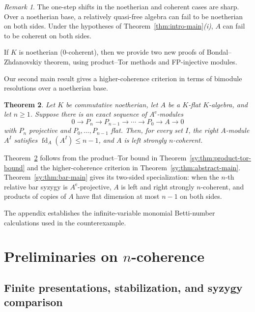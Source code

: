 \documentclass[11pt]{article}
\numberwithin{equation}{section}
\newtheorem{theorem}{Theorem}[section]
\theoremstyle{definition}
\theoremstyle{remark}
\newtheorem{remark}[theorem]{Remark}
\begin{document}
\begin{remark}
The one-step shifts in the noetherian and coherent cases are sharp.
Over a noetherian base, a relatively quasi-free algebra can fail to be
noetherian on both sides.  Under the hypotheses of
Theorem~\ref{thm:intro-main}\emph{(i)}, $A$ can fail to be coherent
on both sides.
\end{remark}

If $K$ is noetherian ($0$-coherent), then we provide two new proofs of 
Bondal--Zhdanovskiy theorem, using product--Tor methods and FP-injective
modules.

Our second main result gives a higher-coherence criterion in terms of
bimodule resolutions over a noetherian base.

\begin{theorem}\label{thm:intro-bimodule}
Let $K$ be commutative noetherian, let $A$ be a $K$-flat
$K$-algebra, and let $n\ge1$.  Suppose there is an exact sequence
of $A^{\mathrm e}$-modules
\[
0\longrightarrow P_n\longrightarrow P_{n-1}
\longrightarrow\cdots\longrightarrow P_0
\longrightarrow A\longrightarrow0
\]
with $P_n$ projective and $P_0,\ldots,P_{n-1}$ flat.
Then, for every set $I$, the right $A$-module $A^I$ satisfies
$\operatorname{fd}_A(A^I)\le n-1$, and $A$ is left strongly
$n$-coherent.
\end{theorem}

Theorem~\ref{thm:intro-bimodule} follows from the product--Tor bound in
Theorem~\ref{sy:thm:product-tor-bound} and the higher-coherence
criterion in Theorem~\ref{sy:thm:abstract-main}.
Theorem~\ref{sy:thm:bar-main} gives its two-sided specialization:
when the $n$-th relative bar syzygy is $A^{\mathrm e}$-projective,
$A$ is left and right strongly $n$-coherent, and products of copies of
$A$ have flat dimension at most $n-1$ on both sides.




The appendix establishes the infinite-variable monomial Betti-number
calculations used in the counterexample.

\section{Preliminaries on \texorpdfstring{$n$}{n}-coherence}\label{sec:prelim}
\subsection{Finite presentations, stabilization, and syzygy comparison}
\label{subsec:finite-presentations}\label{subsec:finite-syzygy-inequalities}
\end{document}
